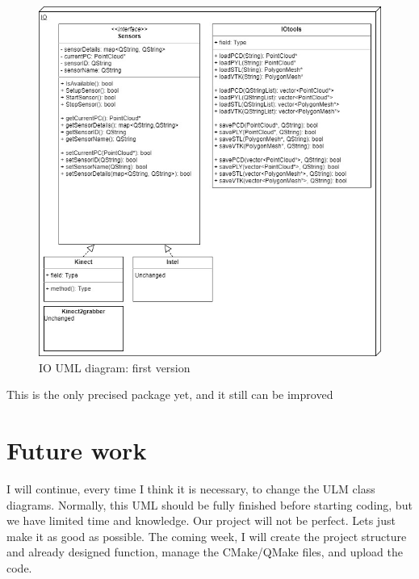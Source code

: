 \documentclass[aps,letterpaper,11pt]{revtex4}
\begin{document}
\begin{figure}[H]
	\centering
	\includegraphics[width=15cm]{IODiagram.jpg}
	\caption{IO UML diagram: first version}
	\label{fig: IOUML}    
\end{figure}

This is the only precised package yet, and it still can be improved


\section{Future work}

I will continue, every time I think it is necessary, to change the ULM class diagrams. Normally, this UML should be fully finished before starting coding, but we have limited time and knowledge. Our project will not be perfect. Lets just make it as good as possible.
The coming week, I will create the project structure and already designed function, manage the CMake/QMake files, and upload the code.
\end{document}
